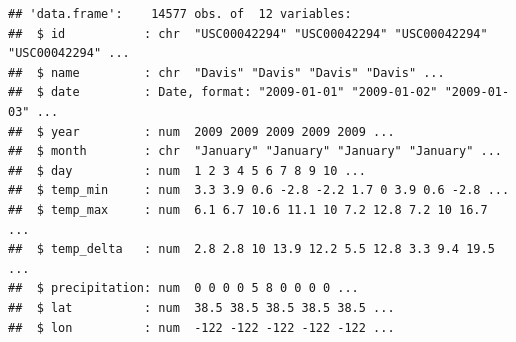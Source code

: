 \documentclass[
]{article}
\begin{document}
\begin{verbatim}
## 'data.frame':    14577 obs. of  12 variables:
##  $ id           : chr  "USC00042294" "USC00042294" "USC00042294" "USC00042294" ...
##  $ name         : chr  "Davis" "Davis" "Davis" "Davis" ...
##  $ date         : Date, format: "2009-01-01" "2009-01-02" "2009-01-03" ...
##  $ year         : num  2009 2009 2009 2009 2009 ...
##  $ month        : chr  "January" "January" "January" "January" ...
##  $ day          : num  1 2 3 4 5 6 7 8 9 10 ...
##  $ temp_min     : num  3.3 3.9 0.6 -2.8 -2.2 1.7 0 3.9 0.6 -2.8 ...
##  $ temp_max     : num  6.1 6.7 10.6 11.1 10 7.2 12.8 7.2 10 16.7 ...
##  $ temp_delta   : num  2.8 2.8 10 13.9 12.2 5.5 12.8 3.3 9.4 19.5 ...
##  $ precipitation: num  0 0 0 0 5 8 0 0 0 0 ...
##  $ lat          : num  38.5 38.5 38.5 38.5 38.5 ...
##  $ lon          : num  -122 -122 -122 -122 -122 ...
\end{verbatim}
\end{document}
